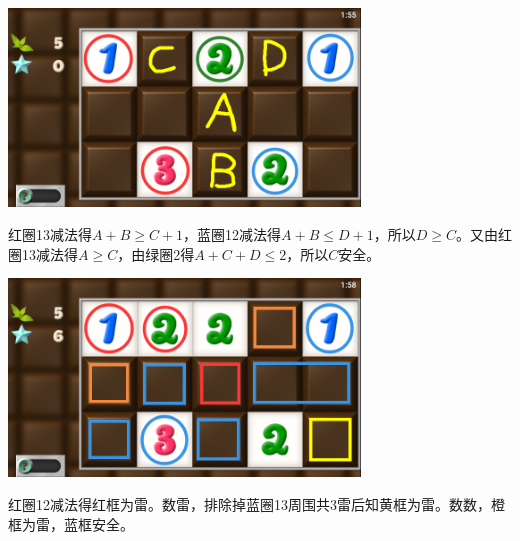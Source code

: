 \subsection{} %
\begin{center}
    \includegraphics[width=0.7\textwidth]{puzzle/89-1.png}
\end{center}
红圈13减法得$A+B\ge C+1$，蓝圈12减法得$A+B\le D+1$，所以$D\ge C$。又由红圈13减法得$A\ge C$，由绿圈2得$A+C+D\le 2$，所以$C$安全。
\begin{center}
    \includegraphics[width=0.7\textwidth]{puzzle/89-2.png}
\end{center}
红圈12减法得红框为雷。数雷，排除掉蓝圈13周围共3雷后知黄框为雷。数数，橙框为雷，蓝框安全。